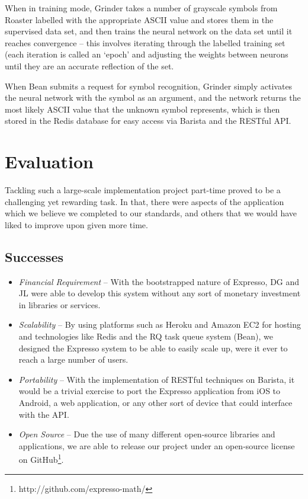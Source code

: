\documentclass{acm_proc_article-sp}
\begin{document}
When in training mode, Grinder takes a number of grayscale symbols from Roaster labelled with the appropriate ASCII value and stores them in the supervised data set, and then trains the neural network on the data set until it reaches convergence -- this involves iterating through the labelled training set (each iteration is called an `epoch' and adjusting the weights between neurons until they are an accurate reflection of the set. 

When Bean submits a request for symbol recognition, Grinder simply activates the neural network with the symbol as an argument, and the network returns the most likely ASCII value that the unknown symbol represents, which is then stored in the Redis database for easy access via Barista and the RESTful API.


\section{Evaluation}
Tackling such a large-scale implementation project part-time proved to be a challenging yet rewarding task. In that, there were aspects of the application which we believe we completed to our standards, and others that we would have liked to improve upon given more time. 

\subsection{Successes}
\begin{itemize}
	\item{\emph{Financial Requirement}} -- With the bootstrapped nature of Expresso, DG and JL were able to develop this system without any sort of monetary investment in libraries or services.
	\item{\emph{Scalability}} -- By using platforms such as Heroku and Amazon EC2 for hosting and technologies like Redis and the RQ task queue system (Bean), we designed the Expresso system to be able to easily scale up, were it ever to reach a large number of users.
	\item{\emph{Portability}} -- With the implementation of RESTful techniques on Barista, it would be a trivial exercise to port the Expresso application from iOS to Android, a web application, or any other sort of device that could interface with the API.
	\item{\emph{Open Source}} -- Due the use of many different open-source libraries and applications, we are able to release our project under an open-source license on GitHub\footnote{http://github.com/expresso-math/}.

\end{itemize}
\end{document}
